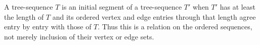 \begin{definition}
A tree-sequence $T$ is an initial segment of a tree-sequence $T'$ when
$T'$ has at least the length of $T$ and its ordered vertex and edge entries
through that length agree entry by entry with those of $T$.  Thus this is a
relation on the ordered sequences, not merely inclusion of their vertex or
edge sets.
\end{definition}
